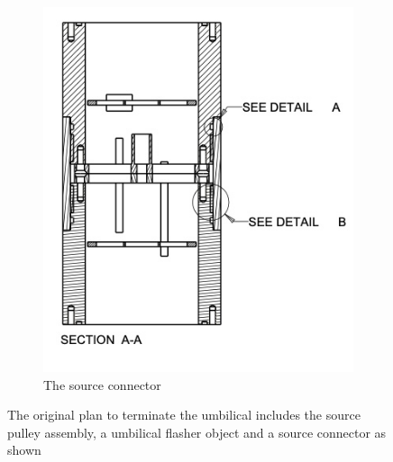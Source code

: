 \documentclass[11pt]{article}
\begin{document}
\begin{figure}
\begin{subfigure}{0.45\textwidth}
  \includegraphics[width=\textwidth]{SourceConnectorSection}
  \caption{The source connector}
  \label{fig:sourceConn}
\end{subfigure}
\caption{The original plan to terminate the umbilical includes the source pulley assembly, a umbilical flasher object and a source connector as shown}
\end{figure}
\end{document}
